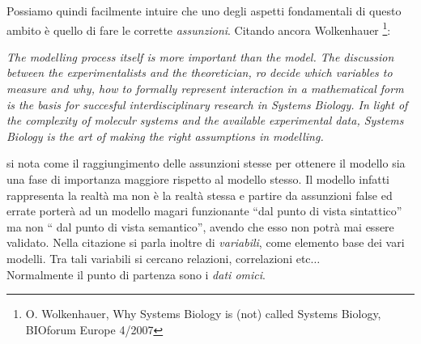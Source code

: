 \documentclass[a4paper,12pt, oneside]{book}
\begin{document}
Possiamo quindi facilmente intuire che uno degli aspetti fondamentali di questo
ambito è quello di fare le corrette \textit{assunzioni}. Citando ancora
Wolkenhauer \footnote{O. Wolkenhauer, Why Systems Biology is (not) called
  Systems Biology, BIOforum Europe 4/2007}:
\begin{center}
  \textit{The modelling process itself is more important than the model. The
    discussion between the experimentalists and the theoretician, ro decide
    which variables to measure and why, how to formally represent interaction in
    a mathematical form is the basis for succesful interdisciplinary research in
    Systems Biology. In light of the complexity of moleculr systems and the
    available experimental data, Systems Biology is the art of making the right
    assumptions in modelling.}
\end{center}
si nota come il raggiungimento delle assunzioni stesse per ottenere il modello
sia una fase di importanza maggiore rispetto al modello stesso. Il modello
infatti rappresenta la realtà ma non è la realtà stessa e partire da assunzioni
false ed errate porterà ad un modello magari funzionante ``dal punto di vista
sintattico'' ma non `` dal punto di vista semantico'', avendo che esso non potrà
mai essere validato. Nella citazione si parla inoltre di \textit{variabili},
come elemento base dei vari modelli. Tra tali variabili si cercano relazioni,
correlazioni etc$\ldots$\\
Normalmente il punto di partenza sono i \textit{dati omici}.
\end{document}

